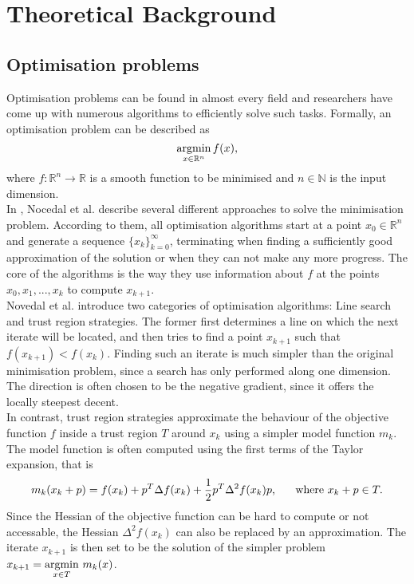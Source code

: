 \label{section:theoreticalBackground}
\section{Theoretical Background}
\subsection{Optimisation problems}
Optimisation problems can be found in almost every field and researchers have come up with numerous algorithms to efficiently solve such tasks. Formally, an optimisation problem can be described as 
\[\operatorname*{argmin}_{x \in \mathbb{R}^n} f(x),\]
where $f\colon \mathbb{R}^n\to \mathbb{R}$ is a smooth function to be minimised and $n \in \mathbb{N}$ is the input dimension.\\
In \cite{NoceWrig06}, Nocedal et al. describe several different approaches to solve the minimisation problem. According to them, all optimisation algorithms start at a point $x_0 \in \mathbb{R}^n$ and generate a sequence $\{x_k\}_{k=0}^\infty$, terminating when finding a sufficiently good approximation of the solution or when they can not make any more progress. The core of the algorithms is the way they use information about $f$ at the points $x_0, x_1, ..., x_k$ to compute $x_{k+1}$. \\
\indent Novedal et al. introduce two categories of optimisation algorithms: Line search and trust region strategies. The former first determines a line on which the next iterate will be located, and then tries to find a point $x_{k+1}$ such that $f(x_{k+1}) < f(x_k)$. Finding such an iterate is much simpler than the original minimisation problem, since a search has only performed along one dimension. The direction is often chosen to be the negative gradient, since it offers the locally steepest decent. 
\\ \indent In contrast, trust region strategies approximate the behaviour of the objective function $f$ inside a trust region $T$ around $x_k$ using a simpler model function $m_k$. The model function is often computed using the first terms of the Taylor expansion, that is \[m_k(x_k + p) = f(x_k) + p^T\Delta f(x_k) + \frac{1}{2}p^T\Delta^2 f(x_k) p \text{, \indent where } x_k + p \in T.\] Since the Hessian of the objective function can be hard to compute or not accessable, the Hessian $\Delta^2 f(x_k)$ can also be replaced by an approximation. The iterate $x_{k+1}$ is then set to be the solution of the simpler problem $x_{k+1} = \underset{x \in T}{\operatorname*{argmin} }  \,\,m_k(x)$.

